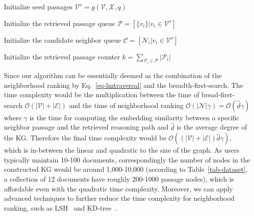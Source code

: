 \SetAlCapSty{}
\SetAlgoNoEnd
\begin{algorithm}[htbp!]
 \DontPrintSemicolon
 \small
 
Initialize seed passages $\mathcal{V}^s = g(\mathcal{V}, \mathcal{X}, q)$

Initialize the retrieved passage queue $\mathcal{P} = [\{v_i\}|v_i \in \mathcal{V}^{s}]$
 
Initialize the candidate neighbor queue $\mathcal{C} = [\mathcal{N}_i|v_i \in \mathcal{V}^s]$

Initialize the retrieved passage counter $k = \sum_{\mathcal{P}_i \in \mathcal{P}}|\mathcal{P}_i|$
 

\caption{\small LLM-based KG Traversal Algorithm to Retrieve Relevant Context for Content-based Question.}
\end{algorithm}


Since our algorithm can be essentially deemed as the combination of the neighborhood ranking by Eq.~\eqref{eq-lmtraversal} and the breadth-first-search. The time complexity would be the multiplication between the time of bread-first-search $\mathcal{O}(|\mathcal{V}| + |\mathcal{E}|)$ and the time of neighborhood ranking $\mathcal{O}(|\mathcal{N}|\gamma) = \mathcal{O}(\hat{d}\gamma)$ where $\gamma$ is the time for computing the embedding similarity between a specific neighbor passage and the retrieved reasoning path and $\hat{d}$ is the average degree of the KG. Therefore the final time complexity would be $\mathcal{O}((|\mathcal{V}| + |\mathcal{E}|)\hat{d}\gamma)$, which is in-between the linear and quadratic to the size of the graph. As users typically maintain 10-100 documents, correspondingly the number of nodes in the constructed KG would be around 1,000-10,000 (according to Table~\ref{tab-dataset}, a collection of 12 documents have roughly 200-1000 passage nodes), which is affordable even with the quadratic time complexity. Moreover, we can apply advanced techniques to further reduce the time complexity for neighborhood ranking, such as LSH~\cite{gionis1999similarity} and KD-tree~\cite{qu2020data}.


